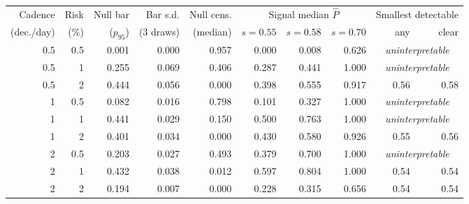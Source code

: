 \begin{tabular}{rrrrrrrrrr}
\toprule
Cadence & Risk & Null bar & Bar s.d. & Null cens. & \multicolumn{3}{c}{Signal median $\hat P$} & \multicolumn{2}{c}{Smallest detectable} \\
\cmidrule(lr){6-8}\cmidrule(lr){9-10}
(dec./day) & (\%) & ($p_{95}$) & (3 draws) & (median) & $s=0.55$ & $s=0.58$ & $s=0.70$ & any & clear \\
\midrule
0.5 & 0.5 & 0.001 & 0.000 & 0.957 & 0.000 & 0.008 & 0.626 & \multicolumn{2}{c}{\emph{uninterpretable}} \\
0.5 & 1 & 0.255 & 0.069 & 0.406 & 0.287 & 0.441 & 1.000 & \multicolumn{2}{c}{\emph{uninterpretable}} \\
0.5 & 2 & 0.444 & 0.056 & 0.000 & 0.398 & 0.555 & 0.917 & 0.56 & 0.58 \\
1 & 0.5 & 0.082 & 0.016 & 0.798 & 0.101 & 0.327 & 1.000 & \multicolumn{2}{c}{\emph{uninterpretable}} \\
1 & 1 & 0.441 & 0.029 & 0.150 & 0.500 & 0.763 & 1.000 & \multicolumn{2}{c}{\emph{uninterpretable}} \\
1 & 2 & 0.401 & 0.034 & 0.000 & 0.430 & 0.580 & 0.926 & 0.55 & 0.56 \\
2 & 0.5 & 0.203 & 0.027 & 0.493 & 0.379 & 0.700 & 1.000 & \multicolumn{2}{c}{\emph{uninterpretable}} \\
2 & 1 & 0.432 & 0.038 & 0.012 & 0.597 & 0.804 & 1.000 & 0.54 & 0.54 \\
2 & 2 & 0.194 & 0.007 & 0.000 & 0.228 & 0.315 & 0.656 & 0.54 & 0.54 \\
\bottomrule
\end{tabular}
